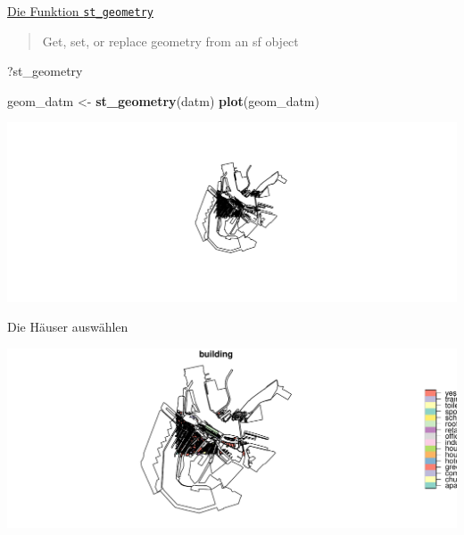 \documentclass[ignorenonframetext,]{beamer}
\newenvironment{Shaded}{\begin{snugshade}}{\end{snugshade}}
\newcommand{\KeywordTok}[1]{\textcolor[rgb]{0.13,0.29,0.53}{\textbf{#1}}}
\newcommand{\NormalTok}[1]{#1}
\newcommand{\OperatorTok}[1]{\textcolor[rgb]{0.81,0.36,0.00}{\textbf{#1}}}
\newcommand{\StringTok}[1]{\textcolor[rgb]{0.31,0.60,0.02}{#1}}
\begin{document}
\begin{frame}[fragile]{\href{https://cran.r-project.org/web/packages/sf/vignettes/sf3.html}{Die
Funktion \texttt{st\_geometry}}}
\protect\hypertarget{die-funktion-st_geometry}{}

\begin{quote}
Get, set, or replace geometry from an sf object
\end{quote}

\begin{Shaded}
\begin{Highlighting}[]
\NormalTok{?st_geometry}
\end{Highlighting}
\end{Shaded}

\begin{Shaded}
\begin{Highlighting}[]
\NormalTok{geom_datm <-}\StringTok{ }\KeywordTok{st_geometry}\NormalTok{(datm)}
\KeywordTok{plot}\NormalTok{(geom_datm)}
\end{Highlighting}
\end{Shaded}

\includegraphics{B7_simplefeatures_files/figure-beamer/unnamed-chunk-24-1.pdf}

\end{frame}

\begin{frame}[fragile]{Die Häuser auswählen}
\protect\hypertarget{die-hauser-auswahlen}{}

\begin{Shaded}
\end{Shaded}

\includegraphics{B7_simplefeatures_files/figure-beamer/unnamed-chunk-25-1.pdf}

\end{frame}
\end{document}
